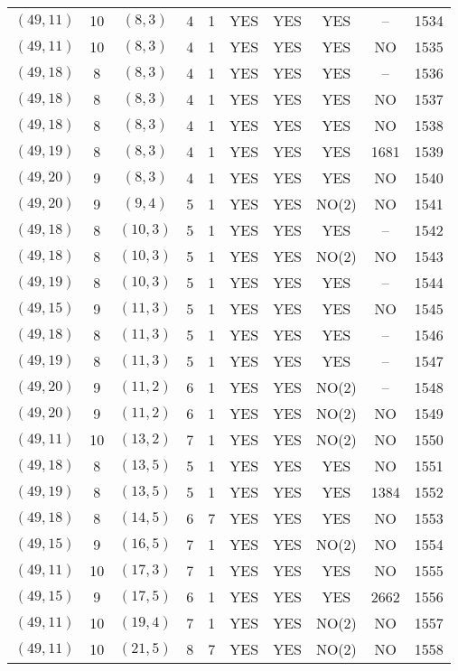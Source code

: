 \begin{longtable}{|c|c|c|c|c|c|c|c|c|c|}
$(49, 11)$ & 10 & $(8, 3)$ & 4 & 1 & YES & YES & YES & -- & 1534\\
$(49, 11)$ & 10 & $(8, 3)$ & 4 & 1 & YES & YES & YES & NO & 1535\\
$(49, 18)$ & 8 & $(8, 3)$ & 4 & 1 & YES & YES & YES & -- & 1536\\
$(49, 18)$ & 8 & $(8, 3)$ & 4 & 1 & YES & YES & YES & NO & 1537\\
$(49, 18)$ & 8 & $(8, 3)$ & 4 & 1 & YES & YES & YES & NO & 1538\\
$(49, 19)$ & 8 & $(8, 3)$ & 4 & 1 & YES & YES & YES & 1681 & 1539\\
$(49, 20)$ & 9 & $(8, 3)$ & 4 & 1 & YES & YES & YES & NO & 1540\\
$(49, 20)$ & 9 & $(9, 4)$ & 5 & 1 & YES & YES & NO(2) & NO & 1541\\
$(49, 18)$ & 8 & $(10, 3)$ & 5 & 1 & YES & YES & YES & -- & 1542\\
$(49, 18)$ & 8 & $(10, 3)$ & 5 & 1 & YES & YES & NO(2) & NO & 1543\\
$(49, 19)$ & 8 & $(10, 3)$ & 5 & 1 & YES & YES & YES & -- & 1544\\
$(49, 15)$ & 9 & $(11, 3)$ & 5 & 1 & YES & YES & YES & NO & 1545\\
$(49, 18)$ & 8 & $(11, 3)$ & 5 & 1 & YES & YES & YES & -- & 1546\\
$(49, 19)$ & 8 & $(11, 3)$ & 5 & 1 & YES & YES & YES & -- & 1547\\
$(49, 20)$ & 9 & $(11, 2)$ & 6 & 1 & YES & YES & NO(2) & -- & 1548\\
$(49, 20)$ & 9 & $(11, 2)$ & 6 & 1 & YES & YES & NO(2) & NO & 1549\\
$(49, 11)$ & 10 & $(13, 2)$ & 7 & 1 & YES & YES & NO(2) & NO & 1550\\
$(49, 18)$ & 8 & $(13, 5)$ & 5 & 1 & YES & YES & YES & NO & 1551\\
$(49, 19)$ & 8 & $(13, 5)$ & 5 & 1 & YES & YES & YES & 1384 & 1552\\
$(49, 18)$ & 8 & $(14, 5)$ & 6 & 7 & YES & YES & YES & NO & 1553\\
$(49, 15)$ & 9 & $(16, 5)$ & 7 & 1 & YES & YES & NO(2) & NO & 1554\\
$(49, 11)$ & 10 & $(17, 3)$ & 7 & 1 & YES & YES & YES & NO & 1555\\
$(49, 15)$ & 9 & $(17, 5)$ & 6 & 1 & YES & YES & YES & 2662 & 1556\\
$(49, 11)$ & 10 & $(19, 4)$ & 7 & 1 & YES & YES & NO(2) & NO & 1557\\
$(49, 11)$ & 10 & $(21, 5)$ & 8 & 7 & YES & YES & NO(2) & NO & 1558\\

\end{longtable}
